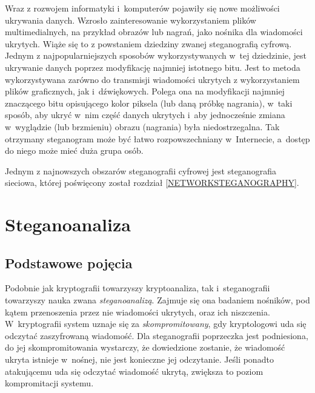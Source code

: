 \documentclass[a4paper, twoside, openright, 12pt]{report}
\begin{document}
        Wraz z rozwojem informatyki i~komputerów pojawiły się nowe możliwości
        ukrywania danych. Wzrosło zainteresowanie wykorzystaniem plików
        multimedialnych, na przykład obrazów lub nagrań, jako nośnika dla wiadomości
        ukrytych. Wiąże się to z powstaniem dziedziny zwanej steganografią cyfrową.
        Jednym z najpopularniejszych sposobów wykorzystywanych w~tej dziedzinie,
        jest ukrywanie danych poprzez modyfikację najmniej istotnego bitu. Jest
        to metoda wykorzystywana zarówno do transmisji wiadomości ukrytych z wykorzystaniem
        plików graficznych\cite{LSBSTEGANGRAPHY}, jak i~dźwiękowych\cite{AUDIOLSBSTEGANGRAPHY}.
        Polega ona na modyfikacji najmniej znaczącego bitu opisującego kolor piksela
        (lub daną próbkę nagrania), w~taki sposób, aby ukryć w~nim część danych
        ukrytych i~aby jednocześnie zmiana w~wyglądzie (lub brzmieniu) obrazu (nagrania)
        była niedostrzegalna. Tak otrzymany steganogram może być łatwo rozpowszechniany
        w~Internecie, a~dostęp do niego może mieć duża grupa osób.

        Jednym z najnowszych obszarów steganografii cyfrowej jest steganografia
        sieciowa, której poświęcony został rozdział \ref{NETWORKSTEGANOGRAPHY}.

    \section{Steganoanaliza}
        \subsection{Podstawowe pojęcia}
        Podobnie jak kryptografii towarzyszy kryptoanaliza, tak i~steganografii
        towarzyszy nauka zwana \emph{steganoanalizą}. Zajmuje się ona badaniem
        nośników, pod kątem przenoszenia przez nie wiadomości ukrytych, oraz ich niszczenia.
        W~kryptografii system uznaje się
        za \emph{skompromitowany}, gdy kryptologowi uda się odczytać zaszyfrowaną wiadomość.
        Dla steganografii poprzeczka jest podniesiona, do jej skompromitowania wystarczy,
        że dowiedzione zostanie, że wiadomość ukryta istnieje w~nośnej, nie jest
        konieczne jej odczytanie. Jeśli ponadto atakującemu uda się odczytać wiadomość
        ukrytą, zwiększa to poziom kompromitacji systemu.
\end{document}
